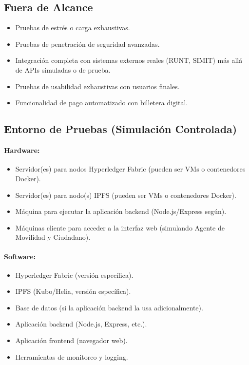 \documentclass[
    letterpaper, 
    man,   
    spanish,
    12pt,
    donotrepeattitle,
    floatsintext,
    hidelinks %
]{apa7}
\begin{document}
\subsection{Fuera de Alcance}
\begin{itemize}
    \item Pruebas de estrés o carga exhaustivas.
    \item Pruebas de penetración de seguridad avanzadas.
    \item Integración completa con sistemas externos reales (RUNT, SIMIT) más allá de APIs simuladas o de prueba.
    \item Pruebas de usabilidad exhaustivas con usuarios finales.
    \item Funcionalidad de pago automatizado con billetera digital.
\end{itemize}

\subsection{Entorno de Pruebas (Simulación Controlada)}
\paragraph{Hardware:}
\begin{itemize}
    \item Servidor(es) para nodos Hyperledger Fabric (pueden ser VMs o contenedores Docker). 
    \item Servidor(es) para nodo(s) IPFS (pueden ser VMs o contenedores Docker). 
    \item Máquina para ejecutar la aplicación backend (Node.js/Express según). 
    \item Máquinas cliente para acceder a la interfaz web (simulando Agente de Movilidad y Ciudadano).
\end{itemize}
\paragraph{Software:}
\begin{itemize}
    \item Hyperledger Fabric (versión específica). 
    \item IPFS (Kubo/Helia, versión específica).
    \item Base de datos (si la aplicación backend la usa adicionalmente). 
    \item Aplicación backend (Node.js, Express, etc.).
        \item Aplicación frontend (navegador web). 
    \item Herramientas de monitoreo y logging.
\end{itemize}
\end{document}
